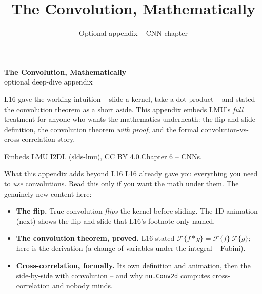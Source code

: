 \documentclass[aspectratio=43]{beamer}
\title{The Convolution, Mathematically}
\subtitle{Optional appendix -- CNN chapter}
\date{}
\begin{document}
\begin{frame}[plain]
  \vfill
  \begin{center}
    {\Large\color{popblue}\textbf{The Convolution, Mathematically}}\\[0.4em]
    {\normalsize\color{gray} optional deep-dive appendix}\\[0.9em]
    \begin{minipage}{0.86\textwidth}\centering\small
      L16 gave the working intuition -- slide a kernel, take a dot product -- and stated the
      convolution theorem as a short aside. This appendix embeds LMU's \emph{full} treatment
      for anyone who wants the mathematics underneath: the flip-and-slide definition, the
      convolution theorem \emph{with proof}, and the formal
      convolution-vs-cross-correlation story.
    \end{minipage}
  \end{center}
  \vfill
  {\scriptsize\color{gray} Embeds LMU I2DL (slds-lmu), CC BY 4.0.\quad Chapter 6 -- CNNs.}
\end{frame}

\begin{frame}{What this appendix adds beyond L16}
  L16 already gave you everything you need to \emph{use} convolutions. Read this only if you
  want the math under them. The genuinely new content here:
  \vfill
  \begin{itemize}\small
    \item \textbf{The flip.} True convolution \emph{flips} the kernel before sliding. The 1D
      animation (next) shows the flip-and-slide that L16's footnote only named.
    \item \textbf{The convolution theorem, proved.} L16 stated
      $\mathcal{F}\{f \ast g\} = \mathcal{F}\{f\}\,\mathcal{F}\{g\}$; here is the derivation
      (a change of variables under the integral -- Fubini).
    \item \textbf{Cross-correlation, formally.} Its own definition and animation, then the
      side-by-side with convolution -- and why \texttt{nn.Conv2d} computes cross-correlation
      and nobody minds.
  \end{itemize}
  \vfill
\end{frame}
\end{document}
